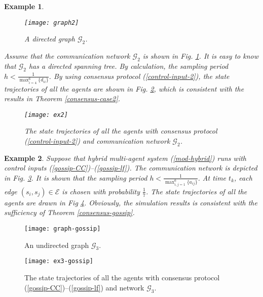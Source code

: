 \documentclass[12pt,draftcls,onecolumn]{IEEEtran}
\newtheorem{example}{Example}
\begin{document}
\begin{example}\label{ex2}

\begin{figure}[htbp]
  \centering
\texttt{[image: graph2]}\\
  \caption{A directed graph $\mathscr{G}_2$.}\label{graph-ex2}
\end{figure}

Assume that the communication network $\mathscr{G}_2$ is shown in Fig. \ref{graph-ex2}. It is easy to know that $\mathscr{G}_2$ has a directed spanning tree. By calculation, the sampling period $h<\frac{1}{\max_{i=4}^6\{d_{ii}\}}$. By using consensus protocol (\ref{control-input-2}), the state trajectories of all the agents are shown in Fig. \ref{result-ex2}, which is consistent with the results in Theorem \ref{consensus-case2}.


\begin{figure}[htbp]
  \centering
\texttt{[image: ex2]}\\
  \caption{The state trajectories of all the agents with consensus protocol (\ref{control-input-2}) and communication network $\mathscr{G}_2$.}\label{result-ex2}
\end{figure}

\end{example}



\begin{example}\label{ex3}
Suppose that hybrid multi-agent system (\ref{mod-hybrid}) runs with control inputs (\ref{gossip-CC})--(\ref{gossip-lf}). The communication network is depicted in Fig. \ref{graph-ex3}. It is shown that the sampling period $h<\frac{1}{\max_{i,j=1}^6\{a_{ij}\}}$. At time $t_k$, each edge $(s_i,s_j)\in \mathscr{E}$ is chosen with probability $\frac{1}{7}$. The state trajectories of all the agents are drawn in Fig \ref{result-ex3}. Obviously, the simulation results is consistent with  the sufficiency of Theorem \ref{consensus-gossip}.
\end{example}

\begin{figure}[htbp]
  \centering
\texttt{[image: graph-gossip]}\\
  \caption{An undirected graph $\mathscr{G}_3$.}\label{graph-ex3}
\end{figure}

\begin{figure}[htbp]
  \centering
\texttt{[image: ex3-gossip]}\\
  \caption{The state trajectories of all the agents with consensus protocol (\ref{gossip-CC})--(\ref{gossip-lf}) and network $\mathscr{G}_3$.}\label{result-ex3}
\end{figure}
\end{document}
